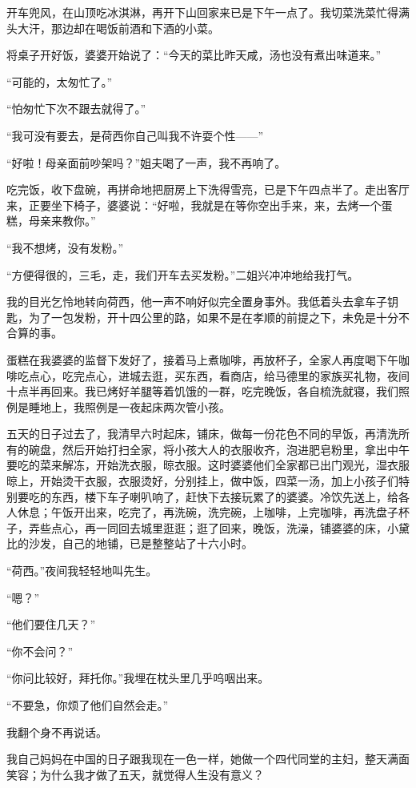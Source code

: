 \par 开车兜风，在山顶吃冰淇淋，再开下山回家来已是下午一点了。我切菜洗菜忙得满头大汗，那边却在喝饭前酒和下酒的小菜。
\par 将桌子开好饭，婆婆开始说了：“今天的菜比昨天咸，汤也没有煮出味道来。”
\par “可能的，太匆忙了。”
\par “怕匆忙下次不跟去就得了。”
\par “我可没有要去，是荷西你自己叫我不许耍个性——”
\par “好啦！母亲面前吵架吗？”姐夫喝了一声，我不再响了。
\par 吃完饭，收下盘碗，再拼命地把厨房上下洗得雪亮，已是下午四点半了。走出客厅来，正要坐下椅子，婆婆说：“好啦，我就是在等你空出手来，来，去烤一个蛋糕，母亲来教你。”
\par “我不想烤，没有发粉。”
\par “方便得很的，三毛，走，我们开车去买发粉。”二姐兴冲冲地给我打气。
\par 我的目光乞怜地转向荷西，他一声不响好似完全置身事外。我低着头去拿车子钥匙，为了一包发粉，开十四公里的路，如果不是在孝顺的前提之下，未免是十分不合算的事。
\par 蛋糕在我婆婆的监督下发好了，接着马上煮咖啡，再放杯子，全家人再度喝下午咖啡吃点心，吃完点心，进城去逛，买东西，看商店，给马德里的家族买礼物，夜间十点半再回来。我已烤好羊腿等着饥饿的一群，吃完晚饭，各自梳洗就寝，我们照例是睡地上，我照例是一夜起床两次管小孩。
\par 五天的日子过去了，我清早六时起床，铺床，做每一份花色不同的早饭，再清洗所有的碗盘，然后开始打扫全家，将小孩大人的衣服收齐，泡进肥皂粉里，拿出中午要吃的菜来解冻，开始洗衣服，晾衣服。这时婆婆他们全家都已出门观光，湿衣服晾上，开始烫干衣服，衣服烫好，分别挂上，做中饭，四菜一汤，加上小孩子们特别要吃的东西，楼下车子喇叭响了，赶快下去接玩累了的婆婆。冷饮先送上，给各人休息；午饭开出来，吃完了，再洗碗，洗完碗，上咖啡，上完咖啡，再洗盘子杯子，弄些点心，再一同回去城里逛逛；逛了回来，晚饭，洗澡，铺婆婆的床，小黛比的沙发，自己的地铺，已是整整站了十六小时。
\par “荷西。”夜间我轻轻地叫先生。
\par “嗯？”
\par “他们要住几天？”
\par “你不会问？”
\par “你问比较好，拜托你。”我埋在枕头里几乎呜咽出来。
\par “不要急，你烦了他们自然会走。”
\par 我翻个身不再说话。
\par 我自己妈妈在中国的日子跟我现在一色一样，她做一个四代同堂的主妇，整天满面笑容；为什么我才做了五天，就觉得人生没有意义？
